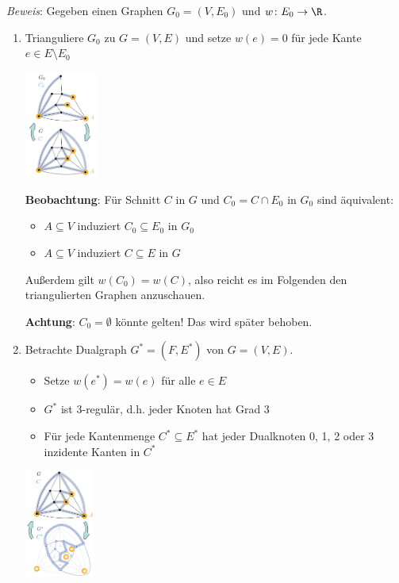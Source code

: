 \textit{Beweis}: Gegeben einen Graphen $G_0=(V, E_0)$ und $w\colon E_0\rightarrow\R$.
\begin{enumerate}
	\item Trianguliere $G_0$ zu $G=(V,E)$ und setze $w(e)=0$ für jede Kante $e\in E\setminus E_0$
	\begin{center}
		\includegraphics[width=0.19\textwidth]{images/mmc-1.png}
	\end{center}
	\textbf{Beobachtung}: Für Schnitt $C$ in $G$ und $C_0=C\cap E_0$ in $G_0$ sind äquivalent:
	\begin{itemize}
		\item $A\subseteq V$ induziert $C_0\subseteq E_0$ in $G_0$
		\item $A\subseteq V$ induziert $C\subseteq E$ in $G$
	\end{itemize}
	Außerdem gilt $w(C_0)=w(C)$, also reicht es im Folgenden den triangulierten Graphen anzuschauen. 
	
	\textbf{Achtung}: $C_0=\emptyset$ könnte gelten! Das wird später behoben.
	
	\item Betrachte Dualgraph $G^*=(F,E^*)$ von $G=(V,E)$.
	\begin{itemize}
		\item Setze $w(e^*)=w(e)$ für alle $e\in E$
		\item $G^*$ ist 3-regulär, d.h. jeder Knoten hat Grad 3
		\item Für jede Kantenmenge $C^*\subseteq E^*$ hat jeder Dualknoten 0, 1, 2 oder 3 inzidente Kanten in $C^*$
	\end{itemize}
	\begin{center}
		\includegraphics[width=0.18\textwidth]{images/mmc-2.png}
	\end{center}
	

\end{enumerate}
